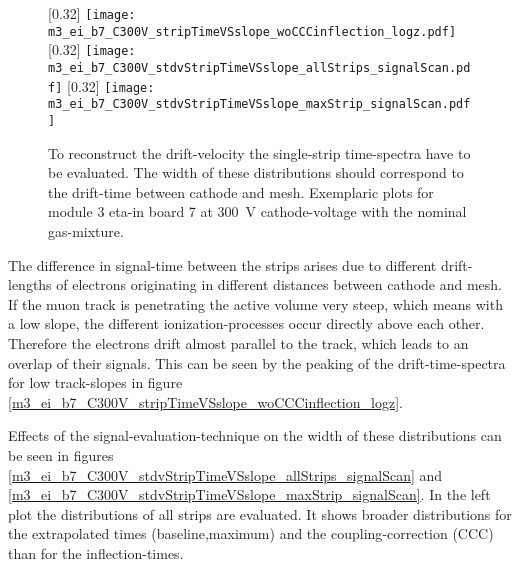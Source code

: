 \documentclass[
twoside,            %
BCOR1.4cm,          %
10pt,               %
headings=normal,    %
headsepline,        %
clearplainpage,		%
final,              %
div=14,
open=right,
bibliography=toc
]{scrreprt}
\begin{document}
\begin{figure}[!h]
	\centering
	[0.32\textwidth]
	{\texttt{[image: m3\_ei\_b7\_C300V\_stripTimeVSslope\_woCCCinflection\_logz.pdf]}}
	\hfill
	[0.32\textwidth]
	{\texttt{[image: m3\_ei\_b7\_C300V\_stdvStripTimeVSslope\_allStrips\_signalScan.pdf]}}
	\hfill
	[0.32\textwidth]
	{\texttt{[image: m3\_ei\_b7\_C300V\_stdvStripTimeVSslope\_maxStrip\_signalScan.pdf]}}
	\vspace{-2mm}
	\caption{
		To reconstruct the drift-velocity the single-strip time-spectra have to be evaluated.
		The width of these distributions should correspond to the drift-time between cathode and mesh.
		Exemplaric plots for module 3 eta-in board 7 at \SI{300}{V} cathode-voltage with the nominal gas-mixture.
	}
\end{figure}

The difference in signal-time between the strips arises due to different drift-lengths of electrons originating in different distances between cathode and mesh.
If the muon track is penetrating the active volume very steep, which means with a low slope, the different ionization-processes occur directly above each other.
Therefore the electrons drift almost parallel to the track, which leads to an overlap of their signals. 
This can be seen by the peaking of the drift-time-spectra for low track-slopes in figure \ref{m3_ei_b7_C300V_stripTimeVSslope_woCCCinflection_logz}.

Effects of the signal-evaluation-technique on the width of these distributions can be seen in figures \ref{m3_ei_b7_C300V_stdvStripTimeVSslope_allStrips_signalScan} and \ref{m3_ei_b7_C300V_stdvStripTimeVSslope_maxStrip_signalScan}.
In the left plot the distributions of all strips are evaluated.
It shows broader distributions for the extrapolated times (baseline,maximum) and the coupling-correction (CCC) than for the inflection-times.
\end{document}
